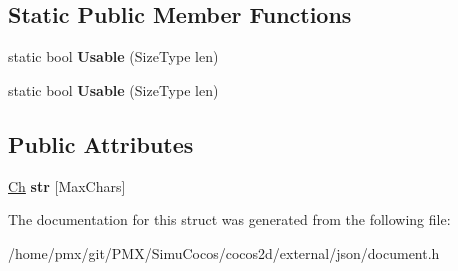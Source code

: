 \subsection*{Static Public Member Functions}
\begin{DoxyCompactItemize}
\item 
\mbox{\label{structGenericValue_1_1ShortString_a73e40f625c1abbd84f95ac7fff8365f7}} 
static bool {\bfseries Usable} (Size\+Type len)
\item 
\mbox{\label{structGenericValue_1_1ShortString_a73e40f625c1abbd84f95ac7fff8365f7}} 
static bool {\bfseries Usable} (Size\+Type len)
\end{DoxyCompactItemize}
\subsection*{Public Attributes}
\begin{DoxyCompactItemize}
\item 
\mbox{\label{structGenericValue_1_1ShortString_a0e2a5204df2d9fdfd2ee18906cb282dd}} 
\hyperlink{classGenericValue_ade0e0ce64ccd5d852da57a35e720bafb}{Ch} {\bfseries str} \mbox{[}Max\+Chars\mbox{]}
\end{DoxyCompactItemize}


The documentation for this struct was generated from the following file\+:\begin{DoxyCompactItemize}
\item 
/home/pmx/git/\+P\+M\+X/\+Simu\+Cocos/cocos2d/external/json/document.\+h\end{DoxyCompactItemize}
